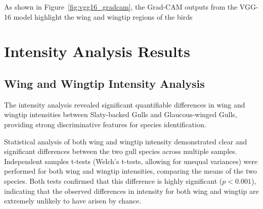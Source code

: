 \documentclass[a4paper,12pt]{report}
\begin{document}
As shown in Figure~\ref{fig:vgg16_gradcam}, the Grad-CAM outputs from the VGG-16 model highlight the wing and wingtip regions of the birds


\section{Intensity Analysis Results}

\subsection{Wing and Wingtip Intensity Analysis}

The intensity analysis revealed significant quantifiable differences in wing and wingtip intensities between Slaty-backed Gulls and Glaucous-winged Gulls, providing strong discriminative features for species identification.

Statistical analysis of both wing and wingtip intensity demonstrated clear and significant differences between the two gull species across multiple samples. Independent samples t-tests (Welch's t-tests, allowing for unequal variances) were performed for both wing and wingtip intensities, comparing the means of the two species. Both tests  confirmed that this difference is highly significant ($p < 0.001$), indicating that the observed differences in intensity for both wing and wingtip are extremely unlikely to have arisen by chance.

\begin{table}[H]
    \centering
    \caption{Wing and Wingtip Intensity Statistical Summary}
    \label{tab:intensity-stats-combined}
\end{table}
\end{document}
